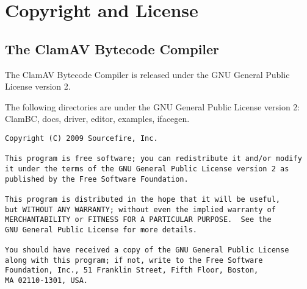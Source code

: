 \chapter{Copyright and License}
\section{The ClamAV Bytecode Compiler}
The ClamAV Bytecode Compiler is released under the GNU General Public License
version 2.

The following directories are under the GNU General Public License version 2:
ClamBC, docs, driver, editor, examples, ifacegen.

{\footnotesize
\begin{verbatim}
Copyright (C) 2009 Sourcefire, Inc.

This program is free software; you can redistribute it and/or modify
it under the terms of the GNU General Public License version 2 as
published by the Free Software Foundation.

This program is distributed in the hope that it will be useful,
but WITHOUT ANY WARRANTY; without even the implied warranty of
MERCHANTABILITY or FITNESS FOR A PARTICULAR PURPOSE.  See the
GNU General Public License for more details.

You should have received a copy of the GNU General Public License
along with this program; if not, write to the Free Software
Foundation, Inc., 51 Franklin Street, Fifth Floor, Boston,
MA 02110-1301, USA.
\end{verbatim}
}

